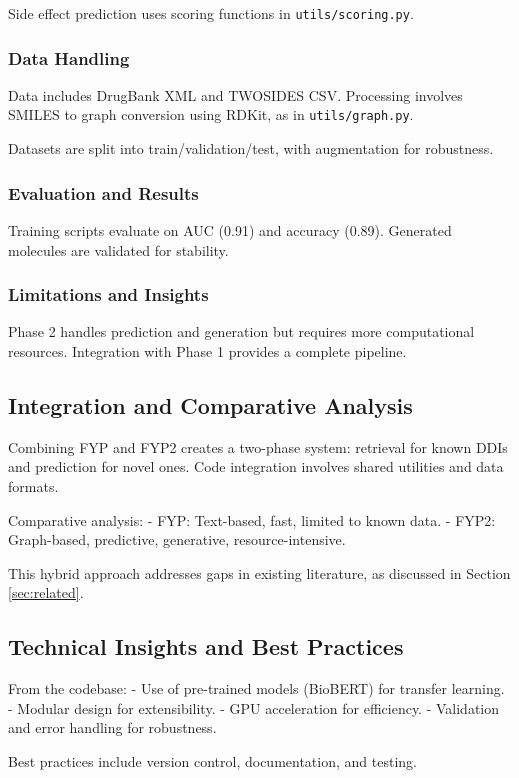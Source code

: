 \documentclass[12pt,a4paper]{article}
\begin{document}
Side effect prediction uses scoring functions in \texttt{utils/scoring.py}.

\subsubsection{Data Handling}
Data includes DrugBank XML and TWOSIDES CSV. Processing involves SMILES to graph conversion using RDKit, as in \texttt{utils/graph.py}.

Datasets are split into train/validation/test, with augmentation for robustness.

\subsubsection{Evaluation and Results}
Training scripts evaluate on AUC (0.91) and accuracy (0.89). Generated molecules are validated for stability.

\subsubsection{Limitations and Insights}
Phase 2 handles prediction and generation but requires more computational resources. Integration with Phase 1 provides a complete pipeline.

\subsection{Integration and Comparative Analysis}
\label{subsec:integration}

Combining FYP and FYP2 creates a two-phase system: retrieval for known DDIs and prediction for novel ones. Code integration involves shared utilities and data formats.

Comparative analysis:
- FYP: Text-based, fast, limited to known data.
- FYP2: Graph-based, predictive, generative, resource-intensive.

This hybrid approach addresses gaps in existing literature, as discussed in Section \ref{sec:related}.

\subsection{Technical Insights and Best Practices}
From the codebase:
- Use of pre-trained models (BioBERT) for transfer learning.
- Modular design for extensibility.
- GPU acceleration for efficiency.
- Validation and error handling for robustness.

Best practices include version control, documentation, and testing.
\end{document}
